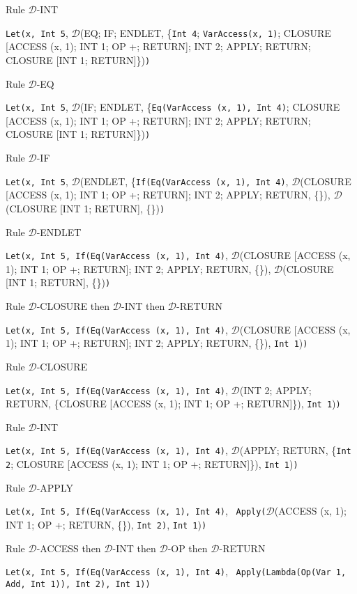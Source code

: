 \documentclass[11pt]{article}
\begin{document}
\begin{landscape}
{\smallskip
\noindent Rule $\mathcal{D}$-INT
\smallskip

\noindent \texttt{Let(x, }\texttt{Int 5}, $\mathcal{D}$(EQ; IF; ENDLET, \{\texttt{Int 4}; \texttt{VarAccess(x, 1)}; CLOSURE [ACCESS (x, 1); INT 1; OP +; RETURN]; INT 2; APPLY; RETURN; CLOSURE [INT 1; RETURN]\})\texttt{)}

\smallskip
\noindent Rule $\mathcal{D}$-EQ
\smallskip

\noindent \texttt{Let(x, }\texttt{Int 5}, $\mathcal{D}$(IF; ENDLET, \{\texttt{Eq(VarAccess (x, 1), Int 4)};  CLOSURE [ACCESS (x, 1); INT 1; OP +; RETURN]; INT 2; APPLY; RETURN; CLOSURE [INT 1; RETURN]\})\texttt{)}

\smallskip
\noindent Rule $\mathcal{D}$-IF
\smallskip

\noindent \texttt{Let(x, }\texttt{Int 5}, $\mathcal{D}$(ENDLET, \{\texttt{If(Eq(VarAccess (x, 1), Int 4)}, $\mathcal{D}$(CLOSURE [ACCESS (x, 1); INT 1; OP +; RETURN]; INT 2; APPLY; RETURN, \{\}), $\mathcal{D}$(CLOSURE [INT 1; RETURN], \{\})\texttt{)}


\smallskip
\noindent Rule $\mathcal{D}$-ENDLET
\smallskip

\noindent \texttt{Let(x, Int 5, If(Eq(VarAccess (x, 1), Int 4)}, $\mathcal{D}$(CLOSURE [ACCESS (x, 1); INT 1; OP +; RETURN]; INT 2; APPLY; RETURN, \{\}), $\mathcal{D}$(CLOSURE [INT 1; RETURN], \{\})\texttt{)}

\smallskip
\noindent Rule $\mathcal{D}$-CLOSURE then $\mathcal{D}$-INT then $\mathcal{D}$-RETURN
\smallskip

\noindent \texttt{Let(x, Int 5, If(Eq(VarAccess (x, 1), Int 4)}, $\mathcal{D}$(CLOSURE [ACCESS (x, 1); INT 1; OP +; RETURN]; INT 2; APPLY; RETURN, \{\}), \texttt{Int 1})\texttt{)}

\smallskip
\noindent Rule $\mathcal{D}$-CLOSURE
\smallskip

\noindent \texttt{Let(x, Int 5, If(Eq(VarAccess (x, 1), Int 4)}, $\mathcal{D}$(INT 2; APPLY; RETURN, \{CLOSURE [ACCESS (x, 1); INT 1; OP +; RETURN]\}), \texttt{Int 1})\texttt{)}

\smallskip
\noindent Rule $\mathcal{D}$-INT
\smallskip

\noindent \texttt{Let(x, Int 5, If(Eq(VarAccess (x, 1), Int 4)}, $\mathcal{D}$(APPLY; RETURN, \{\texttt{Int 2}; CLOSURE [ACCESS (x, 1); INT 1; OP +; RETURN]\}), \texttt{Int 1})\texttt{)}

\smallskip
\noindent Rule $\mathcal{D}$-APPLY
\smallskip

\noindent \texttt{Let(x, Int 5, If(Eq(VarAccess (x, 1), Int 4)}, \ \texttt{Apply(}$\mathcal{D}$(ACCESS (x, 1); INT 1; OP +; RETURN, \{\}), \texttt{Int 2)}, \texttt{Int 1})\texttt{)}

\smallskip
\noindent Rule $\mathcal{D}$-ACCESS then $\mathcal{D}$-INT then $\mathcal{D}$-OP then $\mathcal{D}$-RETURN
\smallskip

\noindent \texttt{Let(x, Int 5, If(Eq(VarAccess (x, 1), Int 4)}, \ \texttt{Apply(Lambda(Op(Var 1, Add, Int 1)), \texttt{Int 2)}, \texttt{Int 1})\texttt{)}}

}






\end{landscape}
\end{document}
